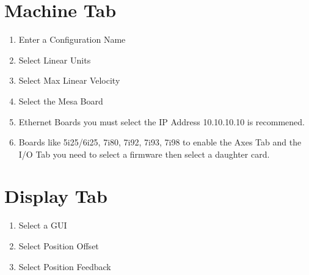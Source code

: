 \documentclass[letterpaper,10pt,english,openany,oneside]{sphinxmanual}
\begin{document}
\section{Machine Tab}
\label{\detokenize{basic:machine-tab}}\begin{enumerate}
%
\item {} 
Enter a Configuration Name

\item {} 
Select Linear Units

\item {} 
Select Max Linear Velocity

\item {} 
Select the Mesa Board

\item {} 
Ethernet Boards you must select the IP Address 10.10.10.10 is recommened.

\item {} 
Boards like 5i25/6i25, 7i80, 7i92, 7i93, 7i98 to enable the Axes Tab
and the I/O Tab you need to select a firmware then select a daughter card.

\end{enumerate}


\section{Display Tab}
\label{\detokenize{basic:display-tab}}\begin{enumerate}
%
\item {} 
Select a GUI

\item {} 
Select Position Offset

\item {} 
Select Position Feedback

\end{enumerate}
\end{document}
